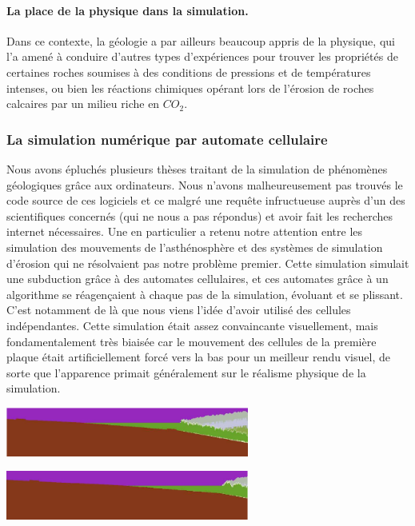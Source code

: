 \documentclass[a4paper,11pt]{article}
\begin{document}
\paragraph{La place de la physique dans la simulation.}

Dans ce contexte, la géologie a par ailleurs beaucoup appris de la physique, qui l'a amené à conduire d'autres types d'expériences pour trouver les propriétés de certaines roches soumises à des conditions de pressions et de températures intenses, ou bien les réactions chimiques opérant lors de l'érosion de roches calcaires par un milieu riche en $CO_2$.

\subsubsection{La simulation numérique par automate cellulaire}

Nous avons épluchés plusieurs thèses traitant de la simulation de phénomènes géologiques grâce aux ordinateurs.
Nous n'avons malheureusement pas trouvés le code source de ces logiciels et ce malgré une requête infructueuse auprès d'un des scientifiques concernés (qui ne nous a pas répondus) et avoir fait les recherches internet nécessaires.
Une en particulier a retenu notre attention entre les simulation des mouvements de l’asthénosphère et des systèmes de simulation d'érosion qui ne résolvaient pas notre problème premier.
Cette simulation simulait une subduction grâce à des automates cellulaires, et ces automates grâce à un algorithme se réagençaient à chaque pas de la simulation, évoluant et se plissant.
C'est notamment de là que nous viens l'idée d'avoir utilisé des cellules indépendantes.
Cette simulation était assez convaincante visuellement, mais fondamentalement très biaisée car le mouvement des cellules de la première plaque était artificiellement forcé vers la bas pour un meilleur rendu visuel, de sorte que l'apparence primait généralement sur le réalisme physique de la simulation.

\begin{center}
  \includegraphics[width=8cm]{Images/3100_cell.png}
\end{center}
\begin{center}
  \includegraphics[width=8cm]{Images/7100_cell.png}
\end{center}
\end{document}
